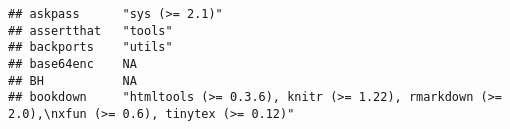 \documentclass[]{book}
\begin{document}
\begin{verbatim}
## askpass      "sys (>= 2.1)"                                                                                                                                                                                                                                                                                                                                                                                                                                                                                              
## assertthat   "tools"                                                                                                                                                                                                                                                                                                                                                                                                                                                                                                     
## backports    "utils"                                                                                                                                                                                                                                                                                                                                                                                                                                                                                                     
## base64enc    NA                                                                                                                                                                                                                                                                                                                                                                                                                                                                                                          
## BH           NA                                                                                                                                                                                                                                                                                                                                                                                                                                                                                                          
## bookdown     "htmltools (>= 0.3.6), knitr (>= 1.22), rmarkdown (>= 2.0),\nxfun (>= 0.6), tinytex (>= 0.12)"                                                                                                                                                                                                                                                                                                                                                                                                              

\end{verbatim}
\end{document}
